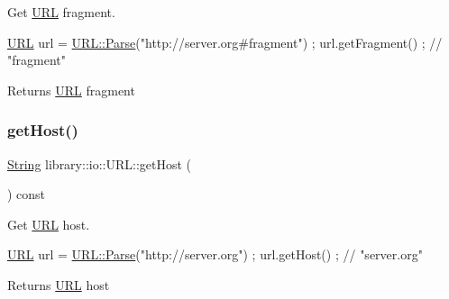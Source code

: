 Get \hyperlink{classlibrary_1_1io_1_1_u_r_l}{U\+RL} fragment. 


\begin{DoxyCode}
\hyperlink{classlibrary_1_1io_1_1_u_r_l_a7e9c070138a6dbd000ffb10b7cd8a5c4}{URL} url = \hyperlink{classlibrary_1_1io_1_1_u_r_l_a03a589af0787df20428d4d33e26bb2d7}{URL::Parse}(\textcolor{stringliteral}{"http://server.org#fragment"}) ;
url.getFragment() ; \textcolor{comment}{// "fragment"}
\end{DoxyCode}


\begin{DoxyReturn}{Returns}
\hyperlink{classlibrary_1_1io_1_1_u_r_l}{U\+RL} fragment 
\end{DoxyReturn}
\mbox{\label{classlibrary_1_1io_1_1_u_r_l_a044ced19c2b73656c52d79a434cea560}} 
\subsubsection{\texorpdfstring{get\+Host()}{getHost()}}
{\footnotesize\ttfamily \hyperlink{namespacelibrary_1_1io_a7469b45835a4421045db344d6a5a1f85}{String} library\+::io\+::\+U\+R\+L\+::get\+Host (\begin{DoxyParamCaption}{ }\end{DoxyParamCaption}) const}



Get \hyperlink{classlibrary_1_1io_1_1_u_r_l}{U\+RL} host. 


\begin{DoxyCode}
\hyperlink{classlibrary_1_1io_1_1_u_r_l_a7e9c070138a6dbd000ffb10b7cd8a5c4}{URL} url = \hyperlink{classlibrary_1_1io_1_1_u_r_l_a03a589af0787df20428d4d33e26bb2d7}{URL::Parse}(\textcolor{stringliteral}{"http://server.org"}) ;
url.getHost() ; \textcolor{comment}{// "server.org"}
\end{DoxyCode}


\begin{DoxyReturn}{Returns}
\hyperlink{classlibrary_1_1io_1_1_u_r_l}{U\+RL} host 
\end{DoxyReturn}
\mbox{\label{classlibrary_1_1io_1_1_u_r_l_a5d8c1d85b26f35d95153a2ed1f45e578}} 
